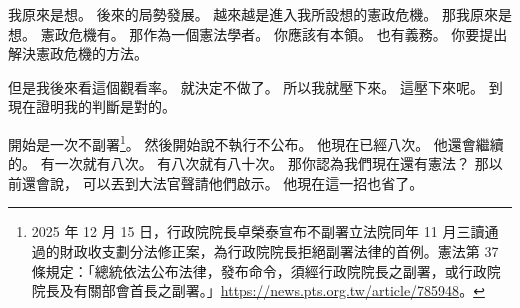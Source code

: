\hypertarget{w01:cue:1379}{}我原來是想。
\hypertarget{w01:cue:1380}{}後來的局勢發展。
\hypertarget{w01:cue:1381}{}越來越是進入我所設想的憲政危機。
\hypertarget{w01:cue:1382}{}那我原來是想。
\hypertarget{w01:cue:1383}{}憲政危機有。
\hypertarget{w01:cue:1384}{}那作為一個憲法學者。
\hypertarget{w01:cue:1385}{}你應該有本領。
\hypertarget{w01:cue:1386}{}也有義務。
\hypertarget{w01:cue:1387}{}你要提出解決憲政危機的方法。

\hypertarget{w01:cue:1388}{}但是我後來看這個觀看率。
\hypertarget{w01:cue:1389}{}就決定不做了。
\hypertarget{w01:cue:1390}{}所以我就壓下來。
\hypertarget{w01:cue:1391}{}這壓下來呢。
\hypertarget{w01:cue:1392}{}到現在證明我的判斷是對的。

\hypertarget{w01:cue:1393}{}開始是一次不副署\footnote{2025 年 12 月 15 日，行政院院長卓榮泰宣布不副署立法院同年 11 月三讀通過的財政收支劃分法修正案，為行政院院長拒絕副署法律的首例。憲法第 37 條規定：「總統依法公布法律，發布命令，須經行政院院長之副署，或行政院院長及有關部會首長之副署。」\url{https://news.pts.org.tw/article/785948}。}。
\hypertarget{w01:cue:1394}{}然後開始說不執行不公布。
\hypertarget{w01:cue:1395}{}他現在已經八次。
\hypertarget{w01:cue:1396}{}他還會繼續的。
\hypertarget{w01:cue:1397}{}有一次就有八次。
\hypertarget{w01:cue:1398}{}有八次就有八十次。
\hypertarget{w01:cue:1399}{}那你認為我們現在還有憲法？
\hypertarget{w01:cue:1400}{}那以前還會說，
\hypertarget{w01:cue:1401}{}可以丟到大法官聲請他們啟示。
\hypertarget{w01:cue:1402}{}他現在這一招也省了。

